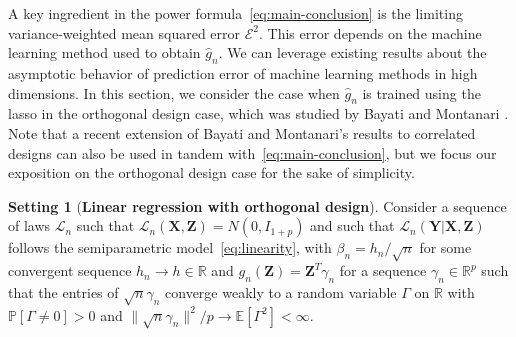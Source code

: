 \documentclass[12pt]{article}
\theoremstyle{definition}
\newtheorem{setting}{Setting}
\theoremstyle{remark}
\newcommand{\prx}{\bm X}
\newcommand{\prz}{\bm Z}
\newcommand{\pry}{{\bm Y}}
\begin{document}
A key ingredient in the power formula~\eqref{eq:main-conclusion} is the limiting variance-weighted mean squared error $\mathcal E^2$. This error depends on the machine learning method used to obtain $\widehat g_n$. We can leverage existing results about the asymptotic behavior of prediction error of machine learning methods in high dimensions. In this section, we consider the case when $\widehat g_n$ is trained using the lasso in the orthogonal design case, which was studied by Bayati and Montanari \cite{Bayati2011}. Note that a recent extension of Bayati and Montanari's results to correlated designs \cite{Celentano2020} can also be used in tandem with~\eqref{eq:main-conclusion}, but we focus our exposition on the orthogonal design case for the sake of simplicity.

\begin{setting}[\bf Linear regression with orthogonal design] \label{setting:orthogonal-design}
Consider a sequence of laws $\mathcal L_n$ such that $\mathcal L_n(\prx, \prz) = N(0, I_{1+p})$ and such that $\mathcal L_n(\pry|\prx, \prz)$ follows the semiparametric model~\eqref{eq:linearity},  with $\beta_n = h_n/\sqrt{n}$ for some convergent sequence $h_n \rightarrow h \in \mathbb R$ and $g_n(\prz) = \prz^T \gamma_n$ for a sequence $\gamma_n \in \mathbb R^p$ such that the entries of $\sqrt n \gamma_n$ converge weakly to a random variable $\Gamma$ on $\mathbb R$ with $\mathbb P[\Gamma \neq 0] > 0$ and $\|\sqrt n \gamma_n\|^2/p \rightarrow \mathbb E[\Gamma^2] < \infty$.
\end{setting}
\end{document}
